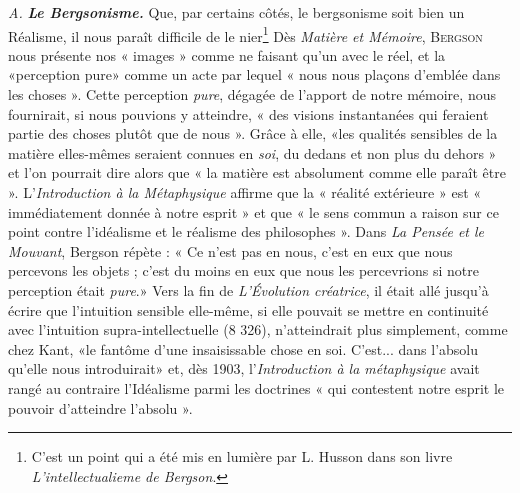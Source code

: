 {\it A.} \textbf{\textit {Le Bergsonisme.}} Que, par certains côtés, le bergsonisme soit
bien un Réalisme, il nous paraît difficile de le nier\footnote{C'est un point qui a été mis en lumière par L. Husson dans son livre
{\it L'intellectualieme de Bergson}.} Dès {\it Matière
et Mémoire}, \textsc{Bergson} nous présente nos « images » comme ne faisant
qu'un avec le réel, et la «perception pure» comme un acte par
lequel « nous nous plaçons d'emblée dans les choses ». Cette perception
{\it pure}, dégagée de l’apport de notre mémoire, nous fournirait, si nous
pouvions y atteindre, « des visions instantanées qui feraient partie
des choses plutôt que de nous ». Grâce à elle, «les qualités sensibles
de la matière elles-mêmes seraient connues en {\it soi}, du dedans et non
plus du dehors » et l’on pourrait dire alors que « la matière est absolument
comme elle paraît être ». L’{\it Introduction à la Métaphysique}
affirme que la « réalité extérieure » est « immédiatement donnée à
notre esprit » et que « le sens commun a raison sur ce point contre
l’idéalisme et le réalisme des philosophes ». Dans {\it La Pensée et le
Mouvant}, Bergson répète : « Ce n’est pas en nous, c’est en eux que nous
percevons les objets ; c’est du moins en eux que nous les percevrions
si notre perception était {\it pure}.» Vers la fin de {\it L’Évolution créatrice},
il était allé jusqu’à écrire que l’intuition sensible elle-même, si elle
pouvait se mettre en continuité avec l'intuition supra-intellectuelle
(8 326), n’atteindrait plus simplement, comme chez Kant, «le fantôme
d’une insaisissable chose en soi. C’est... dans l’absolu qu’elle nous
introduirait» et, dès 1903, l’{\it Introduction à la métaphysique} avait
rangé au contraire l’Idéalisme parmi les doctrines « qui contestent
notre esprit le pouvoir d’atteindre l'absolu ».

